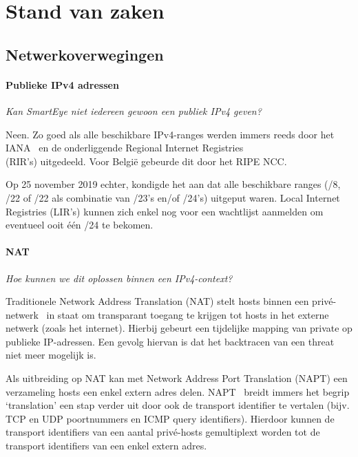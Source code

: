 \section{Stand van zaken}%
\label{sec:state-of-the-art}

\subsection{Netwerkoverwegingen}

\paragraph{Publieke IPv4 adressen}
\emph{Kan SmartEye niet iedereen gewoon een publiek IPv4 geven? }

Neen. Zo goed als alle beschikbare IPv4-ranges werden immers reeds door het IANA~\autocite{ICANN2012} en de onderliggende Regional Internet Registries\\\autocite{Gerich1993} (RIR’s) uitgedeeld. Voor België gebeurde dit door het RIPE NCC.

Op 25 november 2019 echter, kondigde het \textcite{RIPE_NCC2019}  aan dat alle beschikbare ranges (/8, /22 of /22 als combinatie van /23’s en/of /24’s) uitgeput waren. Local Internet Registries (LIR’s) kunnen zich enkel nog voor een wachtlijst aanmelden om eventueel ooit één /24 te bekomen.

\paragraph{NAT}
\emph{Hoe kunnen we dit oplossen binnen een IPv4-context?}

Traditionele Network Address Translation (NAT) stelt hosts binnen een privé-netwerk~\autocite{Moskowitz1996} in staat om transparant toegang te krijgen tot hosts in het externe netwerk (zoals het internet).
Hierbij gebeurt een tijdelijke mapping van private op publieke IP-adressen. Een gevolg hiervan is dat het backtracen van een threat niet meer mogelijk is.

Als uitbreiding op NAT kan met Network Address Port Translation (NAPT) een verzameling hosts een enkel extern adres delen. NAPT~\autocite{Holdrege1999} breidt immers het begrip ‘translation’ een stap verder uit door ook de transport identifier te vertalen (bijv. TCP en UDP poortnummers en ICMP query identifiers). Hierdoor kunnen de transport identifiers van een aantal privé-hosts gemultiplext worden tot de\\transport identifiers van een enkel extern adres.

